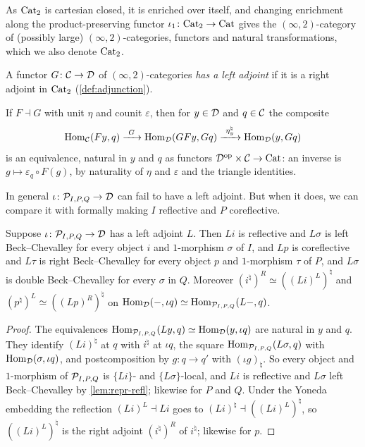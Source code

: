 %
As $\mathrm{Cat}_{2}$ is cartesian closed, it is enriched over itself,
and changing enrichment along the product-preserving functor
$\iota_{1}\colon \mathrm{Cat}_{2} \to \mathrm{Cat}$
\cite{gepnerhaugseng2015enriched} gives the $(\infty,2)$-category of (possibly
large) $(\infty,2)$-categories, functors and natural transformations,
which we also denote $\mathrm{Cat}_{2}$.

\begin{defi}
\label{def:enriched-adjoint}
%
A functor $G\colon \mathcal{C} \to \mathcal{D}$ of $(\infty,2)$-categories \emph{has a left
adjoint} if it is a right adjoint in $\mathrm{Cat}_{2}$ (\cref{def:adjunction}).
\end{defi}

%
If $F \dashv G$ with unit $\eta$ and counit $\varepsilon$,
then for $y \in \mathcal{D}$ and $q \in \mathcal{C}$ the composite
\begin{equation*}
\operatorname{Hom}_{\mathcal{C}}(Fy,q) \xrightarrow{\ G\ } \operatorname{Hom}_{\mathcal{D}}(GFy,Gq)
\xrightarrow{\ \eta_{y}^{\natural}\ } \operatorname{Hom}_{\mathcal{D}}(y,Gq)
\end{equation*}
is an equivalence, natural in $y$ and $q$ as functors
$\mathcal{D}^{\mathrm{op}} \times \mathcal{C} \to \mathrm{Cat}$:
an inverse is
$g \mapsto \varepsilon_{q} \circ F(g)$,
by naturality of $\eta$ and $\varepsilon$ and the triangle identities.

%
In general
$\iota\colon \mathcal{P}_{I,P,Q} \to \mathcal{D}$
can fail to have a left adjoint. But when it does,
we can compare it with formally making $ I $ reflective and $ P $ coreflective.

\begin{prop}
\label{prop:local-adjoint-refl}
%
Suppose
$\iota\colon \mathcal{P}_{I,P,Q} \to \mathcal{D}$
has a left adjoint $L$. Then $Li$ is reflective and $L\sigma$ is left
Beck--Chevalley for every object $i$ and $1$-morphism $\sigma$ of $I$,
and $Lp$ is coreflective and $L\tau$ is right Beck--Chevalley for every object
$p$ and $1$-morphism $\tau$ of $P$, and $L\sigma$ is double Beck--Chevalley for
every $\sigma$ in $Q$. Moreover
$(i^{\natural})^{R} \simeq ((Li)^{L})^{\natural}$
and
$(p^{\natural})^{L} \simeq ((Lp)^{R})^{\natural}$
on
$\operatorname{Hom}_{\mathcal{D}}(-,\iota q) \simeq \operatorname{Hom}_{\mathcal{P}_{I,P,Q}}(L-,q)$.
\end{prop}

\begin{proof}
%
The equivalences
$\operatorname{Hom}_{\mathcal{P}_{I,P,Q}}(Ly,q) \simeq \operatorname{Hom}_{\mathcal{D}}(y,\iota q)$
are natural in $y$ and $q$. They identify $(Li)^{\natural}$ at $q$ with
$i^{\natural}$ at $\iota q$, the square
$\operatorname{Hom}_{\mathcal{P}_{I,P,Q}}(L\sigma,q)$
with
$\operatorname{Hom}_{\mathcal{D}}(\sigma,\iota q)$,
and postcomposition by $g\colon q \to q'$ with $(\iota g)_{\natural}$.
So every object and $1$-morphism of $\mathcal{P}_{I,P,Q}$ is $\{Li\}$- and
$\{L\sigma\}$-local, and $Li$ is reflective and $L\sigma$ left Beck--Chevalley
by \cref{lem:repr-refl}; likewise for $P$ and $Q$.
Under the Yoneda embedding the reflection $(Li)^{L} \dashv Li$ goes to
$(Li)^{\natural} \dashv ((Li)^{L})^{\natural}$,
so
$((Li)^{L})^{\natural}$
is the right adjoint $(i^{\natural})^{R}$ of $i^{\natural}$; likewise for $p$.
\end{proof}

